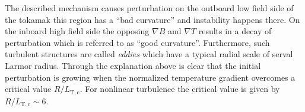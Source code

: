 The described mechanism causes perturbation on the outboard low field side of the tokamak this region has a \enquote{bad curvature} and instability happens there. On the inboard high field side the opposing $\nabla B$ and $\nabla T$ results in a decay of perturbation which is referred to as \enquote{good curvature}. Furthermore, such turbulent structures are called \textit{eddies} which have a typical radial scale of serval Larmor radius. \cite{Newins2006}
Through the explanation above is clear that the initial perturbation is growing when the normalized temperature gradient overcomes a critical value $R/L_\mathrm{T,c}$. For nonlinear turbulence the critical value is given by $R/L_\mathrm{T,c} \sim 6$. \cite{Dimits2000, Isliker2010}